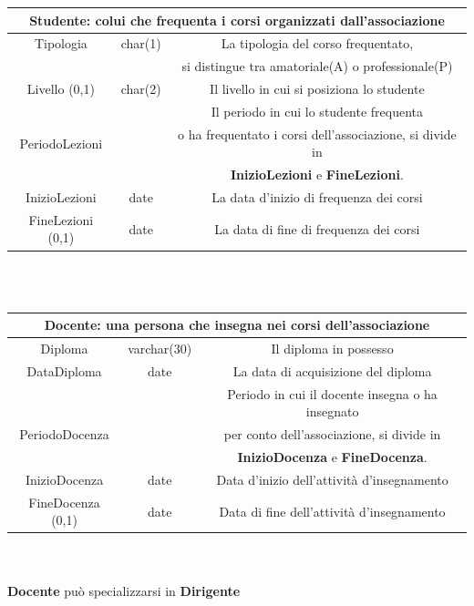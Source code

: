 \documentclass[11pt]{article}
\begin{document}
		\begin{tabular}{|c|c|c|}
			\hline
			\multicolumn{3}{|c|}{\textbf{Studente}: colui che frequenta i corsi organizzati dall'associazione}\\
			\hline
			Tipologia & char(1) & La tipologia del corso frequentato,\\
			 &  & si distingue tra amatoriale(A) o professionale(P) \\
			\hline
			Livello (0,1) & char(2) & Il livello in cui si posiziona lo studente\\
			\hline
			&  & Il periodo in cui lo studente frequenta\\
			PeriodoLezioni &  & o ha frequentato i corsi dell'associazione, si divide in\\
			&  &\textbf{InizioLezioni} e \textbf{FineLezioni}.\\
			InizioLezioni & date & La data d'inizio di frequenza dei corsi\\
			FineLezioni (0,1) & date & La data di fine di frequenza dei corsi\\
			\hline
		\end{tabular}
		\\\\
		\begin{tabular}{|c|c|c|}
			\hline
			\multicolumn{3}{|c|}{\textbf{Docente}: una persona che insegna nei corsi dell'associazione}\\
			\hline
			Diploma & varchar(30) & Il diploma in possesso\\
			\hline
			DataDiploma & date & La data di acquisizione del diploma\\
			\hline
			&  & Periodo in cui il docente insegna o ha insegnato\\
			PeriodoDocenza &  & per conto dell'associazione, si divide in\\
			&  &\textbf{InizioDocenza} e \textbf{FineDocenza}.\\
			InizioDocenza & date & Data d'inizio dell'attività d'insegnamento\\
			FineDocenza (0,1) & date & Data di fine dell'attività d'insegnamento\\
			\hline
		\end{tabular}
		\\\\
		\textbf{Docente} può specializzarsi in \textbf{Dirigente}
		\\
\end{document}
